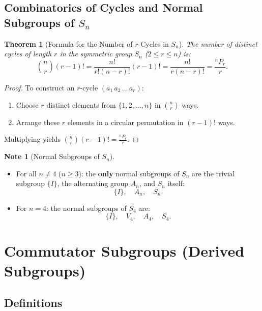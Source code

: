 \documentclass[12pt]{article}
\theoremstyle{definition}
\newtheorem*{note}{Note}
\theoremstyle{plain}
\newtheorem{theorem}{Theorem}[section]
\begin{document}
\subsection{Combinatorics of Cycles and Normal Subgroups of \texorpdfstring{$S_n$}{Sn}}

\begin{theorem}[Formula for the Number of $r$-Cycles in $S_n$]
The number of distinct cycles of length $r$ in the symmetric group $S_n$ ($2 \le r \le n$) is:
\[
\binom{n}{r} (r-1)! = \frac{n!}{r! (n-r)!} (r-1)! = \frac{n!}{r (n-r)!} = \frac{{}^n P_r}{r}.
\]
\end{theorem}

\begin{proof}
To construct an $r$-cycle $(a_1\, a_2\, \dots\, a_r)$:
\begin{enumerate}
    \item Choose $r$ distinct elements from $\{1, 2, \dots, n\}$ in $\binom{n}{r}$ ways.
    \item Arrange these $r$ elements in a circular permutation in $(r-1)!$ ways.
\end{enumerate}
Multiplying yields $\binom{n}{r}(r-1)! = \frac{{}^n P_r}{r}$.
\end{proof}

\begin{note}[Normal Subgroups of $S_n$]
\begin{itemize}
    \item For all $n \neq 4$ ($n \ge 3$): the \textbf{only} normal subgroups of $S_n$ are the trivial subgroup $\{I\}$, the alternating group $A_n$, and $S_n$ itself:
    \[
    \{I\}, \quad A_n, \quad S_n.
    \]
    \item For $n = 4$: the normal subgroups of $S_4$ are:
    \[
    \{I\}, \quad V_4, \quad A_4, \quad S_4.
    \]
\end{itemize}
\end{note}

\newpage
\section{Commutator Subgroups (Derived Subgroups)}

\subsection{Definitions}
\end{document}
